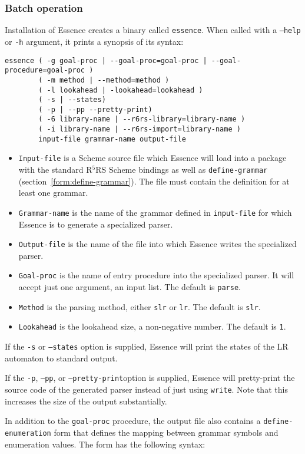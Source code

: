 \documentclass{article}
\newcommand{\codefont}[1]{\texttt{#1}}
\newcommand{\filename}[1]{\texttt{#1}}
\begin{document}
\subsubsection*{Batch operation}
Installation of Essence creates a binary called \filename{essence}.
When called with a \codefont{--help} or \codefont{-h} argument, it
prints a synopsis of its syntax:
%
\begin{verbatim}
essence ( -g goal-proc | --goal-proc=goal-proc | --goal-procedure=goal-proc )
        ( -m method | --method=method )
        ( -l lookahead | -lookahead=lookahead )
        ( -s | --states)
        ( -p | --pp --pretty-print)
        ( -6 library-name | --r6rs-library=library-name )
        ( -i library-name | --r6rs-import=library-name )
        input-file grammar-name output-file
\end{verbatim}
%
\begin{itemize}
\item \texttt{Input-file} is a Scheme source file which Essence will
  load into a package with the standard R$^5$RS Scheme bindings as
  well as \codefont{define-grammar} (section~\ref{form:define-grammar}).  The
  file must contain the definition for at least one grammar.
\item \texttt{Grammar-name} is the name of the grammar defined in
  \texttt{input-file} for which Essence is to generate a specialized
  parser.
\item \texttt{Output-file} is the name of the file into which Essence
  writes the specialized parser.
\item \texttt{Goal-proc} is the name of entry procedure into the
  specialized parser.  It will accept just one argument, an input
  list.  The default is \texttt{parse}.
\item \texttt{Method} is the parsing method, either \texttt{slr} or
  \texttt{lr}.  The default is \texttt{slr}.
\item \texttt{Lookahead} is the lookahead size, a non-negative
  number.  The default is \texttt{1}.
\end{itemize}
%
If the \texttt{-s} or \texttt{--states} option is supplied, Essence
will print the states of the LR automaton to standard output.

If the \texttt{-p}, \texttt{--pp}, or \texttt{--pretty-print}option is
supplied, Essence will pretty-print the source code of the generated
parser instead of just using \texttt{write}.  Note that this
increases the size of the output substantially.

In addition to the \texttt{goal-proc} procedure, the output file also
contains a \texttt{define-\linebreak[0]enumeration} form that defines the mapping
between grammar symbols and enumeration values.  The form has the
following syntax:
\end{document}
